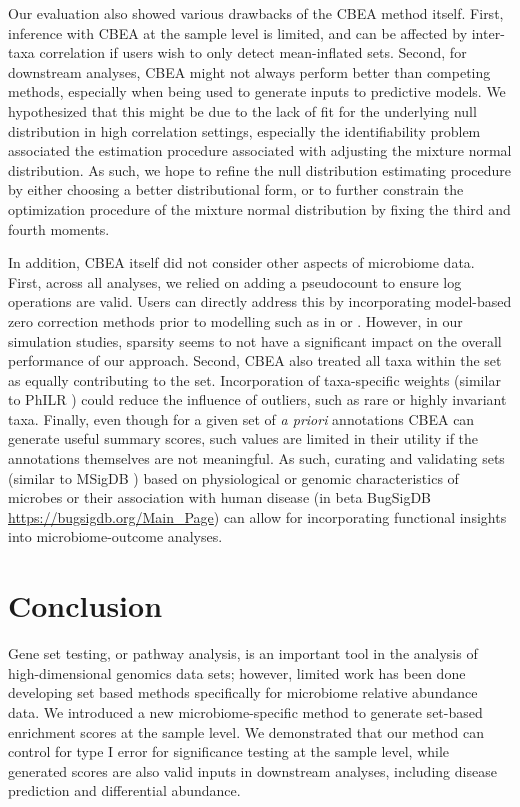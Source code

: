 Our evaluation also showed various drawbacks of the CBEA method itself. First, inference with CBEA at the sample level is limited, and can be affected by inter-taxa correlation if users wish to only detect mean-inflated sets. Second, for downstream analyses, CBEA might not always perform better than competing methods, especially when being used to generate inputs to predictive models. We hypothesized that this might be due to the lack of fit for the underlying null distribution in high correlation settings, especially the identifiability problem associated the estimation procedure associated with adjusting the mixture normal distribution. As such, we hope to refine the null distribution estimating procedure by either choosing a better distributional form, or to further constrain the optimization procedure of the mixture normal distribution by fixing the third and fourth moments. 

In addition, CBEA itself did not consider other aspects of microbiome data. First, across all analyses, we relied on adding a pseudocount to ensure log operations are valid. Users can directly address this by incorporating model-based zero correction methods prior to modelling such as in \cite{martin-fernandez2012} or \cite{kaul2017a}. However, in our simulation studies, sparsity seems to not have a significant impact on the overall performance of our approach. Second, CBEA also treated all taxa within the set as equally contributing to the set. Incorporation of taxa-specific weights (similar to PhILR \cite{silverman2017}) could reduce the influence of outliers, such as rare or highly invariant taxa. Finally, even though for a given set of \emph{a priori} annotations CBEA can generate useful summary scores, such values are limited in their utility if the annotations themselves are not meaningful. As such, curating and validating sets (similar to MSigDB \cite{subramanian2005}) based on physiological or genomic characteristics of microbes \cite{weissman2021} or their association with human disease (in beta BugSigDB \url{https://bugsigdb.org/Main_Page}) can allow for incorporating functional insights into microbiome-outcome analyses.  

\section{Conclusion}
Gene set testing, or pathway analysis, is an important tool in the analysis of high-dimensional genomics data sets; however, limited work has been done developing set based methods specifically for microbiome relative abundance data. We introduced a new microbiome-specific method to generate set-based enrichment scores at the sample level. We demonstrated that our method can control for type I error for significance testing at the sample level, while generated scores are also valid inputs in downstream analyses, including disease prediction and differential abundance.  

